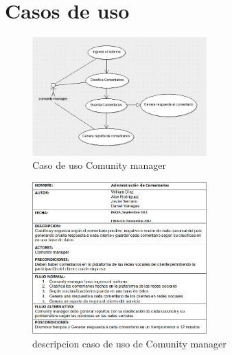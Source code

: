 \chapter{Casos de uso}
\begin{figure}[htbp]
	\centering
		\includegraphics[width=0.60\textwidth]{images/casoinsumosgrafico.jpg}
	\caption{Caso de uso Comunity manager}
	\label{fig:Caso de uso Comunity manager}
\end{figure}%
\begin{figure}[htbp]
	\centering
		\includegraphics[width=0.60\textwidth]{images/casoinsumotabla.jpg}
	\caption{descripcion caso de uso de Comunity manager}
	\label{fig:descripcion caso de uso de Comunity manager}
\end{figure}%
